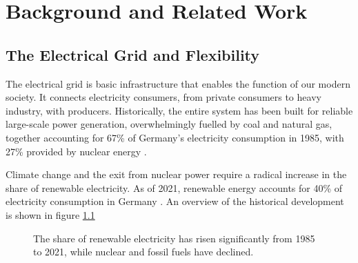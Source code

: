 
\chapter{Background and Related Work} \label{chap:background}
\section{The Electrical Grid and Flexibility}
The electrical grid is basic infrastructure that enables the function of our modern society.
It connects electricity consumers, from private consumers to heavy industry, with producers.
Historically, the entire system has been built for reliable large-scale power generation, overwhelmingly fuelled by coal and natural gas, together accounting for 67\% of Germany's electricity consumption in 1985, with 27\% provided by nuclear energy \citep{ritchie2022Energy}.

Climate change and the exit from nuclear power require a radical increase in the share of renewable electricity. As of 2021, renewable energy accounts for 40\% of electricity consumption in Germany \citep{ritchie2022Energy}.
An overview of the historical development is shown in figure \ref{fig:electricity_mix}

\begin{figure}
    \centering
    \caption{The share of renewable electricity has risen significantly from 1985 to 2021, while nuclear and fossil fuels have declined.}
    \label{fig:electricity_mix}
\end{figure}

